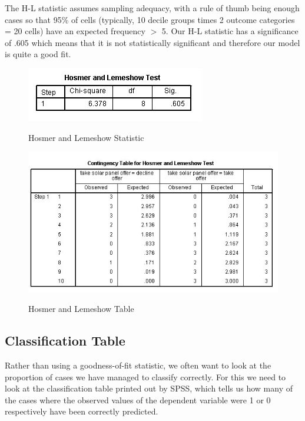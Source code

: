 \documentclass[a4paper,12pt]{article}
\begin{document}
The H-L statistic assumes sampling adequacy, with a rule of thumb being enough cases so that 95\% of cells (typically, 10 decile groups times 2 outcome categories = 20 cells) have an expected frequency $>$ 5. Our H-L statistic has a significance of .605 which means that it is not statistically significant and therefore our model is quite a
good fit.
\begin{figure}[h!]
\begin{center}
  \includegraphics[scale=0.6]{images/Logistic7A}\\
  \caption{Hosmer and Lemeshow Statistic}
\end{center}
\end{figure}

\begin{figure}[h!]
\begin{center}
  \includegraphics[scale=0.6]{images/Logistic6}\\
  \caption{Hosmer and Lemeshow Table}
\end{center}
\end{figure}
\newpage
\subsection{Classification Table}
Rather than using a goodness-of-fit statistic, we often want to look at the proportion of cases we have managed to classify correctly. For this we need to look at the classification table printed out by SPSS, which tells us how many of the cases where the observed values of the dependent variable were 1 or 0 respectively have
been correctly predicted.
\end{document}
